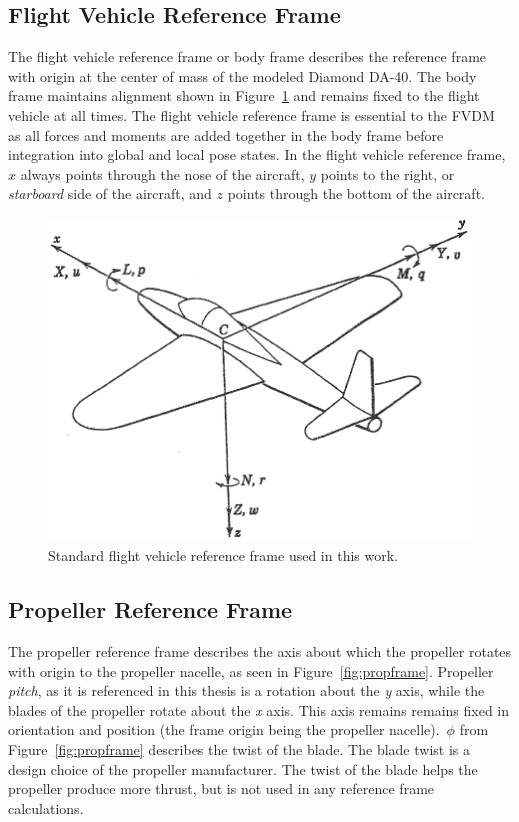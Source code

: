 \subsection{\textbf{Flight Vehicle Reference Frame}}\label{section:FVRF}
The flight vehicle reference frame or body frame describes the reference frame with origin at the center of mass of the modeled Diamond DA-40. The body frame maintains alignment shown in Figure~\ref{fig:flightvehiclereferenceframe} and remains fixed to the flight vehicle at all times. The flight vehicle reference frame is essential to the FVDM as all forces and moments are added together in the body frame before integration into global and local pose states. In the flight vehicle reference frame, \(x\) always points through the nose of the aircraft, \(y\) points to the right, or \textit{starboard} side of the aircraft, and \(z\) points through the bottom of the aircraft.

\begin{figure}[!ht]
    \centering
    \includegraphics[width=0.60\linewidth]{Figures/bodyframe.png}
    \caption{Standard flight vehicle reference frame used in this work.~\cite{peetSpacecraftAircraftDynamics2021}}\label{fig:flightvehiclereferenceframe}
\end{figure}
\clearpage
\subsection{\textbf{Propeller Reference Frame}}
The propeller reference frame describes the axis about which the propeller rotates with origin to the propeller nacelle, as seen in Figure~\ref{fig:propframe}. Propeller \textit{pitch}, as it is referenced in this thesis is a rotation about the \textit{y} axis, while the blades of the propeller rotate about the \textit{x} axis. This axis remains remains fixed in orientation and position (the frame origin being the propeller nacelle).~\( \phi{}\) from Figure~\ref{fig:propframe} describes the twist of the blade. The blade twist is a design choice of the propeller manufacturer. The twist of the blade helps the propeller produce more thrust, but is not used in any reference frame calculations.

